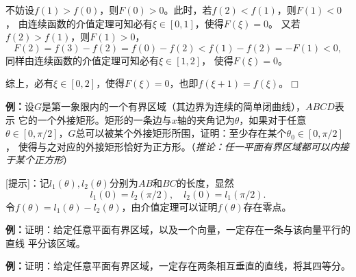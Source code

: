 不妨设$f(1)>f(0)$，则$F(0)>0$。此时，若$f(2)<f(1)$，则$F(1)<0$，
由连续函数的介值定理可知必有$\xi\in[0,1]$，使得$F(\xi)=0$。
又若$f(2)>f(1)$，则$F(1)>0$，
$$F(2)=f(3)-f(2)=f(0)-f(2)<f(1)-f(2)=-F(1)<0,$$
同样由连续函数的介值定理可知必有$\xi\in[1,2]$，
使得$F(\xi)=0$。

综上，必有$\xi\in[0,2]$，使得$F(\xi)=0$，也即$f(\xi+1)=f(\xi)$。\hfill $\Box$

{\bf 例：}设$G$是第一象限内的一个有界区域（其边界为连续的简单闭曲线），$ABCD$表示
它的一个外接矩形。矩形的一条边与$x$轴的夹角记为$\theta$，如果对于任意$\theta\in
[0,\pi/2]$，$G$总可以被某个外接矩形所围，证明：至少存在某个$\theta_0\in[0,\pi/2]$，
使得与之对应的外接矩形恰好为正方形。（{\it 推论：任一平面有界区域都可以内接于某个正方形}）

\begin{center}
\end{center}

[提示]：记$l_1(\theta),l_2(\theta)$分别为$AB$和$BC$的长度，显然
$$l_1(0)=l_2(\pi/2),\quad l_2(0)=l_1(\pi/2).$$
令$f(\theta)=l_1(\theta)-l_2(\theta)$，由介值定理可以证明$f(\theta)$存在零点。

{\bf 例：}证明：给定任意平面有界区域，以及一个向量，一定存在一条与该向量平行的直线
平分该区域。

{\bf 例：}证明：给定任意平面有界区域，一定存在两条相互垂直的直线，将其四等分。

